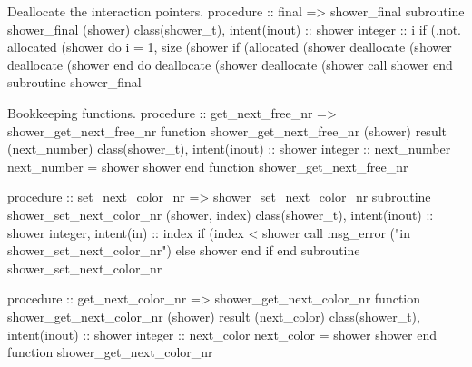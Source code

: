 \eatline
\nwendcode{}Deallocate the interaction pointers.
\nwenddocs{}\plusendmoddef
  procedure :: final => shower_final
\nwendcode{}\plusendmoddef
  subroutine shower_final (shower)
    class(shower_t), intent(inout) :: shower
    integer :: i
    if (.not. allocated (shower%
    do i = 1, size (shower%
       if (allocated (shower%
            deallocate (shower%
       deallocate (shower%
    end do
    deallocate (shower%
    deallocate (shower%
    call shower%
  end subroutine shower_final

\eatline
\nwendcode{}Bookkeeping functions.
\nwenddocs{}\plusendmoddef
  procedure :: get_next_free_nr => shower_get_next_free_nr
\nwendcode{}\plusendmoddef
  function shower_get_next_free_nr (shower) result (next_number)
    class(shower_t), intent(inout) :: shower
    integer :: next_number
    next_number = shower%
    shower%
  end function shower_get_next_free_nr

\eatline
\nwendcode{}\nwdocspar
\nwenddocs{}\plusendmoddef
  procedure :: set_next_color_nr => shower_set_next_color_nr
\nwendcode{}\plusendmoddef
  subroutine shower_set_next_color_nr (shower, index)
    class(shower_t), intent(inout) :: shower
    integer, intent(in) :: index
    if (index < shower%
       call msg_error ("in shower_set_next_color_nr")
    else
       shower%
    end if
  end subroutine shower_set_next_color_nr

\eatline
\nwendcode{}\nwdocspar
\nwenddocs{}\plusendmoddef
  procedure :: get_next_color_nr => shower_get_next_color_nr
\nwendcode{}\plusendmoddef
  function shower_get_next_color_nr (shower) result (next_color)
    class(shower_t), intent(inout) :: shower
    integer :: next_color
    next_color = shower%
    shower%
  end function shower_get_next_color_nr

